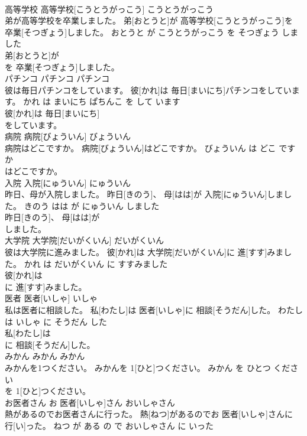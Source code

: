 \documentclass[8pt]{extreport}
\begin{document}
\begin{CJK}{UTF8}{min}
\\	高等学校	高等学校[こうとうがっこう]	こうとうがっこう	
\\	弟が高等学校を卒業しました。	弟[おとうと]が 高等学校[こうとうがっこう]を 卒業[そつぎょう]しました。	おとうと が こうとうがっこう を そつぎょう しました	
\\	弟[おとうと]が
\\	を 卒業[そつぎょう]しました。			
\\	パチンコ	パチンコ	パチンコ	
\\	彼は毎日パチンコをしています。	彼[かれ]は 毎日[まいにち]パチンコをしています。	かれ は まいにち ぱちんこ を して います	
\\	彼[かれ]は 毎日[まいにち]
\\	をしています。			
\\	病院	病院[びょういん]	びょういん	
\\	病院はどこですか。	病院[びょういん]はどこですか。	びょういん は どこ です か	
\\	はどこですか。			
\\	入院	入院[にゅういん]	にゅういん	
\\	昨日、母が入院しました。	昨日[きのう]、 母[はは]が 入院[にゅういん]しました。	きのう はは が にゅういん しました	
\\	昨日[きのう]、 母[はは]が
\\	しました。			
\\	大学院	大学院[だいがくいん]	だいがくいん	
\\	彼は大学院に進みました。	彼[かれ]は 大学院[だいがくいん]に 進[すす]みました。	かれ は だいがくいん に すすみました	
\\	彼[かれ]は
\\	に 進[すす]みました。			
\\	医者	医者[いしゃ]	いしゃ	
\\	私は医者に相談した。	私[わたし]は 医者[いしゃ]に 相談[そうだん]した。	わたし は いしゃ に そうだん した	
\\	私[わたし]は
\\	に 相談[そうだん]した。			
\\	みかん	みかん	みかん	
\\	みかんを1つください。	みかんを 1[ひと]つください。	みかん を ひとつ ください	
\\	を 1[ひと]つください。			
\\	お医者さん	お 医者[いしゃ]さん	おいしゃさん	
\\	熱があるのでお医者さんに行った。	熱[ねつ]があるのでお 医者[いしゃ]さんに 行[い]った。	ねつ が ある の で おいしゃさん に いった	

\end{CJK}
\end{document}
